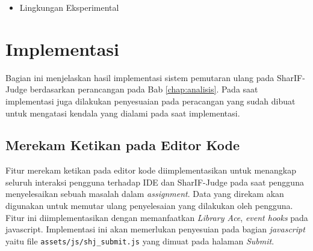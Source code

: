 \begin{itemize}
    \item Lingkungan Eksperimental
\end{itemize}

\section{Implementasi}
\label{sec:5:implementasi}

Bagian ini menjelaskan hasil implementasi sistem pemutaran ulang pada SharIF-Judge berdasarkan perancangan pada Bab \ref{chap:analisis}. Pada saat implementasi juga dilakukan penyesuaian pada peracangan yang sudah dibuat untuk mengatasi kendala yang dialami pada saat implementasi. 

\subsection{Merekam Ketikan pada Editor Kode}
\label{sub:5:2:merekam}

Fitur merekam ketikan pada editor kode diimplementasikan untuk menangkap seluruh interaksi pengguna terhadap IDE dan SharIF-Judge pada saat pengguna menyelesaikan sebuah masalah dalam \textit{assignment}. Data yang direkam akan digunakan untuk memutar ulang penyelesaian yang dilakukan oleh pengguna. Fitur ini diimplementasikan dengan memanfaatkan \textit{Library Ace}, \textit{event hooks} pada javascript. Implementasi ini akan memerlukan penyesuian pada bagian \textit{javascript} yaitu file \verb|assets/js/shj_submit.js| yang dimuat pada halaman \textit{Submit}.

